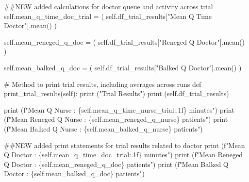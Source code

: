 \documentclass[
  letterpaper,
  DIV=11,
  numbers=noendperiod]{scrreprt}
\newenvironment{Shaded}{}{}
\newcommand{\BuiltInTok}[1]{\textcolor[rgb]{0.84,0.23,0.29}{#1}}
\newcommand{\CommentTok}[1]{\textcolor[rgb]{0.42,0.45,0.49}{#1}}
\newcommand{\KeywordTok}[1]{\textcolor[rgb]{0.84,0.23,0.29}{#1}}
\newcommand{\NormalTok}[1]{\textcolor[rgb]{0.14,0.16,0.18}{#1}}
\newcommand{\OperatorTok}[1]{\textcolor[rgb]{0.14,0.16,0.18}{#1}}
\newcommand{\SpecialCharTok}[1]{\textcolor[rgb]{0.00,0.36,0.77}{#1}}
\newcommand{\SpecialStringTok}[1]{\textcolor[rgb]{0.01,0.18,0.38}{#1}}
\newcommand{\StringTok}[1]{\textcolor[rgb]{0.01,0.18,0.38}{#1}}
\newcommand{\VariableTok}[1]{\textcolor[rgb]{0.89,0.38,0.04}{#1}}
\begin{document}
\begin{tcolorbox}
\begin{Shaded}
\begin{Highlighting}[]
        \CommentTok{\#\#NEW added calculations for doctor queue and activity across trial}
        \VariableTok{self}\NormalTok{.mean\_q\_time\_doc\_trial }\OperatorTok{=}\NormalTok{ (}
            \VariableTok{self}\NormalTok{.df\_trial\_results[}\StringTok{"Mean Q Time Doctor"}\NormalTok{].mean()}
\NormalTok{        )}

        \VariableTok{self}\NormalTok{.mean\_reneged\_q\_doc }\OperatorTok{=}\NormalTok{ (}
            \VariableTok{self}\NormalTok{.df\_trial\_results[}\StringTok{"Reneged Q Doctor"}\NormalTok{].mean()}
\NormalTok{        )}

        \VariableTok{self}\NormalTok{.mean\_balked\_q\_doc }\OperatorTok{=}\NormalTok{ (}
            \VariableTok{self}\NormalTok{.df\_trial\_results[}\StringTok{"Balked Q Doctor"}\NormalTok{].mean()}
\NormalTok{        )}

    \CommentTok{\# Method to print trial results, including averages across runs}
    \KeywordTok{def}\NormalTok{ print\_trial\_results(}\VariableTok{self}\NormalTok{):}
        \BuiltInTok{print}\NormalTok{ (}\StringTok{"Trial Results"}\NormalTok{)}
        \BuiltInTok{print}\NormalTok{ (}\VariableTok{self}\NormalTok{.df\_trial\_results)}

        \BuiltInTok{print}\NormalTok{ (}\SpecialStringTok{f"Mean Q Nurse : }\SpecialCharTok{\{}\VariableTok{self}\SpecialCharTok{.}\NormalTok{mean\_q\_time\_nurse\_trial}\SpecialCharTok{:.1f\}}\SpecialStringTok{ minutes"}\NormalTok{)}
        \BuiltInTok{print}\NormalTok{ (}\SpecialStringTok{f"Mean Reneged Q Nurse : }\SpecialCharTok{\{}\VariableTok{self}\SpecialCharTok{.}\NormalTok{mean\_reneged\_q\_nurse}\SpecialCharTok{\}}\SpecialStringTok{ patients"}\NormalTok{)}
        \BuiltInTok{print}\NormalTok{ (}\SpecialStringTok{f"Mean Balked Q Nurse : }\SpecialCharTok{\{}\VariableTok{self}\SpecialCharTok{.}\NormalTok{mean\_balked\_q\_nurse}\SpecialCharTok{\}}\SpecialStringTok{ patients"}\NormalTok{)}

        \CommentTok{\#\#NEW added print statements for trial results related to doctor}
        \BuiltInTok{print}\NormalTok{ (}\SpecialStringTok{f"Mean Q Doctor : }\SpecialCharTok{\{}\VariableTok{self}\SpecialCharTok{.}\NormalTok{mean\_q\_time\_doc\_trial}\SpecialCharTok{:.1f\}}\SpecialStringTok{ minutes"}\NormalTok{)}
        \BuiltInTok{print}\NormalTok{ (}\SpecialStringTok{f"Mean Reneged Q Doctor : }\SpecialCharTok{\{}\VariableTok{self}\SpecialCharTok{.}\NormalTok{mean\_reneged\_q\_doc}\SpecialCharTok{\}}\SpecialStringTok{ patients"}\NormalTok{)}
        \BuiltInTok{print}\NormalTok{ (}\SpecialStringTok{f"Mean Balked Q Doctor : }\SpecialCharTok{\{}\VariableTok{self}\SpecialCharTok{.}\NormalTok{mean\_balked\_q\_doc}\SpecialCharTok{\}}\SpecialStringTok{ patients"}\NormalTok{)}


\end{Highlighting}
\end{Shaded}
\end{tcolorbox}
\end{document}
